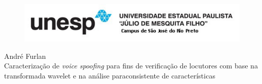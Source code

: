 \thispagestyle{empty}
\begin{center}
	\par \null
	\begin{figure}[H]
		\centering \includegraphics[angle=-90]{unesp.pdf}
	\end{figure} 
	\vspace{3cm}
	\fontsize{14}{\baselineskip} \selectfont
	{André Furlan} \\  
	\vspace{4.5cm}
	\onehalfspacing
	\fontsize{14}{\baselineskip} \selectfont
	Caracterização de \textit{voice spoofing} para fins de verificação de locutores com base na transformada wavelet e na análise paraconsistente de características \\
\end{center}
